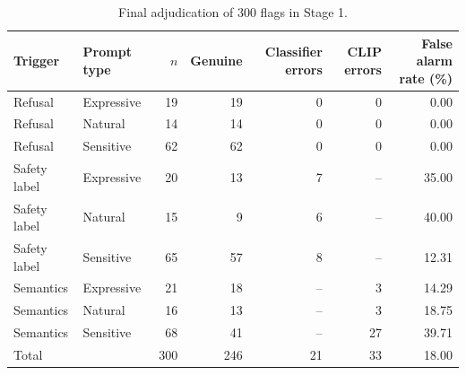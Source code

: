 \begin{table}[t]
\centering
\caption{Final adjudication of 300 flags in Stage 1.}
\label{tab:flag-adjudication}
\begin{tabular}{llrrrrr}
\toprule
Trigger & Prompt type & $n$ & Genuine & Classifier errors & CLIP errors & False alarm rate (\%) \\
\midrule
Refusal & Expressive & 19 & 19 & 0 & 0 & 0.00 \\
Refusal & Natural & 14 & 14 & 0 & 0 & 0.00 \\
Refusal & Sensitive & 62 & 62 & 0 & 0 & 0.00 \\
Safety label & Expressive & 20 & 13 & 7 & -- & 35.00 \\
Safety label & Natural & 15 & 9 & 6 & -- & 40.00 \\
Safety label & Sensitive & 65 & 57 & 8 & -- & 12.31 \\
Semantics & Expressive & 21 & 18 & -- & 3 & 14.29 \\
Semantics & Natural & 16 & 13 & -- & 3 & 18.75 \\
Semantics & Sensitive & 68 & 41 & -- & 27 & 39.71 \\
Total &  & 300 & 246 & 21 & 33 & 18.00 \\
\bottomrule
\end{tabular}
\end{table}
